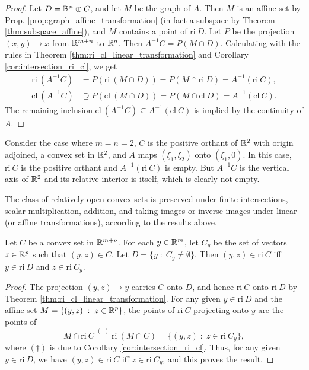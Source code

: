 \documentclass[11pt,a4paper]{article}
\begin{document}
\begin{proof}
    Let $D = \mathbb{R}^n\oplus C$, and let $M$ be the graph of $A$. Then $M$ is an affine set by Prop. \ref{prop:graph_affine_transformation} (in fact a subspace by Theorem \ref{thm:subspace_affine}), and $M$ contains a point of $\mathrm{ri}\ D$. Let $P$ be the projection $(x,y)\rightarrow x$ from $\mathbb{R}^{m+n}$ to $\mathbb{R}^n$. Then $A^{-1}C = P(M\cap D)$. Calculating with the rules in Theorem \ref{thm:ri_cl_linear_transformation} and Corollary \ref{cor:intersection_ri_cl}, we get 
    \begin{align*}
        \mathrm{ri}\ (A^{-1}C) &= P(\mathrm{ri}\ (M\cap D)) = P(M\cap \mathrm{ri}\ D) = A^{-1}(\mathrm{ri}\ C),\\
        \mathrm{cl}\ (A^{-1}C) &\supseteq P(\mathrm{cl}\ (M\cap D)) = P(M\cap \mathrm{cl}\ D) = A^{-1}(\mathrm{cl}\ C).
    \end{align*}
    The remaining inclusion $\mathrm{cl}\ (A^{-1}C)\subseteq A^{-1}(\mathrm{cl}\ C)$ is implied by the continuity of $A$.
\end{proof}

\begin{remark}
    Consider the case where $m = n = 2$, $C$ is the positive orthant of $\mathbb{R}^2$ with origin adjoined, a convex set in $\mathbb{R}^2$, and $A$ maps $(\xi_1,\xi_2)$ onto $(\xi_1,0)$. In this case, $\mathrm{ri}\ C$ is the positive orthant and $A^{-1}(\mathrm{ri}\ C)$ is empty. But $A^{-1}C$ is the vertical axis of $\mathbb{R}^2$ and its relative interior is itself, which is clearly not empty. 
\end{remark}

\begin{remark}
    The class of relatively open convex sets is preserved under finite intersections, scalar multiplication, addition, and taking images or inverse images under linear (or affine transformations), according to the results above.
\end{remark}

\begin{theorem}
    Let $C$ be a convex set in $\mathbb{R}^{m+p}$. For each $y\in \mathbb{R}^m$, let $C_y$ be the set of vectors $z\in \mathbb{R}^p$ such that $(y,z)\in C$. Let $D = \{y\;:\;C_y\neq\emptyset\}$. Then $(y,z)\in \mathrm{ri}\ C$ iff $y\in \mathrm{ri}\ D$ and $z\in \mathrm{ri}\ C_y$.
\end{theorem}

\begin{proof}
    The projection $(y,z)\rightarrow y$ carries $C$ onto $D$, and hence $\mathrm{ri}\ C$ onto $\mathrm{ri}\ D$ by Theorem \ref{thm:ri_cl_linear_transformation}. For any given $y\in \mathrm{ri}\ D$ and the affine set $M = \{(y,z)\;:\;z\in \mathbb{R}^p\}$, the points of $\mathrm{ri}\ C$ projecting onto $y$ are the points of 
    \begin{equation*}
        M\cap \mathrm{ri}\ C \overset{(\dagger)}{=} \mathrm{ri}\ (M\cap C) = \{(y,z)\;:\;z\in \mathrm{ri}\ C_y\},
    \end{equation*}
    where $(\dagger)$ is due to Corollary \ref{cor:intersection_ri_cl}. Thus, for any given $y\in \mathrm{ri}\ D$, we have $(y,z)\in \mathrm{ri}\ C$ iff $z\in \mathrm{ri}\ C_y$, and this proves the result.
\end{proof}
\end{document}
